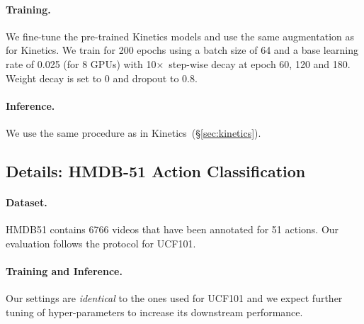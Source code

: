 \documentclass[final]{cvpr}
\def\x{$\times$}
\begin{document}
\paragraph{Training.}
We fine-tune the pre-trained Kinetics models and use the same augmentation as for Kinetics. We train for 200 epochs using a batch size of 64 and a base learning rate of 0.025 (for 8 GPUs) with 10\x~step-wise decay at epoch 60, 120 and 180. Weight decay is set to 0 and dropout to 0.8. 

\paragraph{Inference.} We use the same procedure as in Kinetics~(\S\ref{sec:kinetics}). 

\subsection{Details: HMDB-51 Action Classification}\label{sec:hmdb}

\paragraph{Dataset.}
HMDB51 \cite{Kuehne11} contains 6766 videos that have been annotated for 51 actions. Our evaluation follows the protocol for UCF101.

\paragraph{Training and Inference.}
Our settings are \textit{identical} to the ones used for UCF101 and we expect further tuning of hyper-parameters to increase its downstream performance. 


{\small
	
	
}


	
\end{document}
